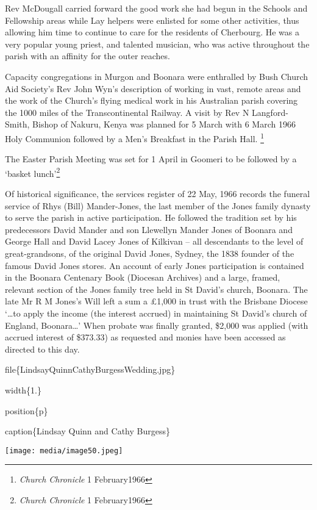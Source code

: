 Rev McDougall carried forward the good work she had begun in the Schools and Fellowship areas while Lay helpers were enlisted for some other activities, thus allowing him time to continue to care for the residents of Cherbourg. He was a very popular young priest, and talented musician, who was active throughout the parish with an affinity for the outer reaches.

Capacity congregations in Murgon and Boonara were enthralled by Bush Church Aid Society's Rev John Wyn's description of working in vast, remote areas and the work of the Church's flying medical work in his Australian parish covering the 1000 miles of the Transcontinental Railway. A visit by Rev N Langford-Smith, Bishop of Nakuru, Kenya was planned for 5 March with 6 March 1966 Holy Communion followed by a Men's Breakfast in the Parish Hall. \footnote{\emph{Church Chronicle} 1 February1966}

The Easter Parish Meeting was set for 1 April in Goomeri to be followed by a `basket lunch'\footnote{\emph{Church Chronicle} 1 February1966}

Of historical significance, the services register of 22 May, 1966 records the funeral service of Rhys (Bill) Mander-Jones, the last member of the Jones family dynasty to serve the parish in active participation. He followed the tradition set by his predecessors David Mander and son Llewellyn Mander Jones of Boonara and George Hall and David Lacey Jones of Kilkivan -- all descendants to the level of great-grandsons, of the original David Jones, Sydney, the 1838 founder of the famous David Jones stores. An account of early Jones participation is contained in the Boonara Centenary Book (Diocesan Archives) and a large, framed, relevant section of the Jones family tree held in St David's church, Boonara. The late Mr R M Jones's Will left a sum a £1,000 in trust with the Brisbane Diocese `\ldots to apply the income (the interest accrued) in maintaining St David's church of England, Boonara\ldots' When probate was finally granted, \$2,000 was applied (with accrued interest of \$373.33) as requested and monies have been accessed as directed to this day.

file\{LindsayQuinnCathyBurgessWedding.jpg\}

width\{1.\}

position\{p\}

caption\{Lindsay Quinn and Cathy Burgess\}

\texttt{[image: media/image50.jpeg]}

